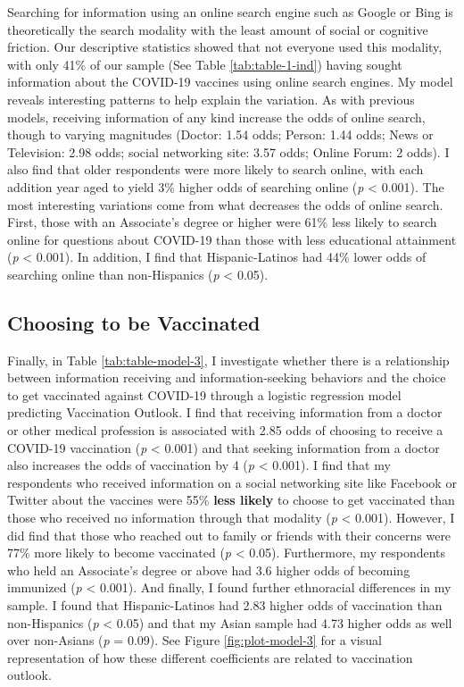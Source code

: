 Searching for information using an online search engine such as Google or Bing
is theoretically the search modality with the least amount of social or cognitive
friction. Our descriptive statistics showed that not everyone used this modality,
with only 41\% of our sample (See Table \ref{tab:table-1-ind}) having sought
information about the COVID-19 vaccines using online search engines. My model
reveals interesting patterns to help explain the variation. As with previous
models, receiving information of any kind increase the odds of online search,
though to varying magnitudes (Doctor: 1.54 odds; Person: 1.44 odds; News or Television: 2.98 odds; 
social networking site: 3.57 odds; Online Forum: 2 odds). I also find that older respondents
were more likely to search online, with each addition year aged to yield 3\%
higher odds of searching online (\emph{p} \textless{} 0.001). The most interesting variations
come from what decreases the odds of online search. First, those with an
Associate's degree or higher were 61\%
less likely to search online for questions about COVID-19 than those with less
educational attainment (\emph{p} \textless{} 0.001). In addition, I find that Hispanic-Latinos
had 44\% lower odds of searching online than non-Hispanics (\emph{p} \textless{} 0.05).

\hypertarget{vaccination-views}{%
\subsection{Choosing to be Vaccinated}\label{vaccination-views}}



Finally, in Table \ref{tab:table-model-3}, I investigate whether there is a
relationship between information receiving and information-seeking behaviors and
the choice to get vaccinated against COVID-19 through a logistic regression
model predicting Vaccination Outlook. I find that receiving information from a
doctor or other medical profession is associated with 2.85 odds of choosing
to receive a COVID-19 vaccination (\emph{p} \textless{} 0.001) and that seeking 
information from a doctor also increases the odds of vaccination by 4 (\emph{p} \textless{} 0.001).
I find that my respondents who received information on a social networking site
like Facebook or Twitter about the vaccines were 55\%
\textbf{less likely} to choose to get vaccinated than those who received no information through
that modality (\emph{p} \textless{} 0.001). However, I did find that those who reached out to
family or friends with their concerns were 77\% more likely to become vaccinated 
(\emph{p} \textless{} 0.05). Furthermore, my respondents who held an Associate's degree
or above had 3.6 higher odds of becoming immunized (\emph{p} \textless{} 0.001).
And finally, I found further ethnoracial differences in my sample. I found that
Hispanic-Latinos had 2.83 higher odds of vaccination than non-Hispanics
(\emph{p} \textless{} 0.05) and that my Asian sample had 4.73 higher odds as well over
non-Asians (\emph{p}  = 0.09). See Figure \ref{fig:plot-model-3} for a visual
representation of how these different coefficients are related to vaccination outlook.

